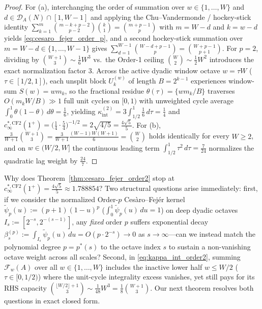 \documentclass[11pt,reqno]{amsart}
\theoremstyle{definition}
\theoremstyle{remark}
\begin{document}
\begin{proof}
For (a), interchanging the order of summation over $w \in \{1, \dots, W\}$ and $d \in \mathcal{D}_A(N) \cap [1, W - 1]$ and applying the Chu--Vandermonde / hockey-stick identity $\sum_{k=1}^m \binom{m - k + p - 2}{p - 2}\binom{k}{1} = \binom{m + p - 1}{p}$ with $m = W - d$ and $k = w - d$ yields \eqref{eq:cesaro_fejer_order_p}, and a second hockey-stick summation over $m = W - d \in \{1, \dots, W - 1\}$ gives $\sum_{d=1}^{W-1} \binom{W - d + p - 1}{p} = \binom{W + p - 1}{p + 1}$. For $p = 2$, dividing by $\binom{W+1}{3} \sim \frac{1}{6}W^3$ vs.\ the Order-1 ceiling $\binom{W}{2} \sim \frac{1}{2}W^2$ introduces the exact normalization factor $3$. Across the active dyadic window octave $w = \tau W$ ($\tau \in [1/2, 1]$), each unsplit block $U_k^{(w)}$ of length $B = 2^{k-1}$ experiences window-sum $S(w) = w m_k$, so the fractional residue $\theta(\tau) = \{w m_k / B\}$ traverses $O(m_k W / B) \gg 1$ full unit cycles on $[0, 1)$ with unweighted cycle average $\int_0^1 \theta(1-\theta)\,d\theta = \frac{1}{6}$, yielding $\kappa_{\mathrm{int}}^{(2)} = 3 \int_{1/2}^1 \frac{1}{6}\,d\tau = \frac{1}{4}$ and $c_\infty^{*,\mathrm{CF2}}(1^+) = \bigl(\frac{1}{4}\cdot\frac{5}{4}\bigr)^{-1/2} = 2\sqrt{4/5} = \frac{4\sqrt{5}}{5}$. For (b), $\frac{3}{W+1}\binom{W+1}{3} = \frac{3}{W+1}\frac{(W-1)W(W+1)}{6} = \binom{W}{2}$ holds identically for every $W \ge 2$, and on $w \in (W/2, W]$ the continuous leading term $\int_{1/2}^1 \tau^2\,d\tau = \frac{7}{24}$ normalizes the quadratic lag weight by $\frac{24}{7}$.
\end{proof}

Why does Theorem~\ref{thm:cesaro_fejer_order2} stop at $c_\infty^{*,\mathrm{CF2}}(1^+) = \frac{4\sqrt{5}}{5} \approx 1.788854$? Two structural questions arise immediately: first, if we consider the normalized Order-$p$ Ces\`aro--Fej\'er kernel $\tilde{\psi}_p(u) := (p + 1)(1 - u)^p$ ($\int_0^1 \tilde{\psi}_p(u)\,du = 1$) on deep dyadic octaves $I_s := [2^{-s}, 2^{-(s-1)}]$, any \emph{fixed} order $p$ suffers exponential decay $\beta_s^{(p)} := \int_{I_s} \tilde{\psi}_p(u)\,du = O(p \cdot 2^{-s}) \to 0$ as $s \to \infty$---can we instead match the polynomial degree $p = p^*(s)$ to the octave index $s$ to sustain a non-vanishing octave weight across all scales? Second, in \eqref{eq:kappa_int_order2}, summing $\mathcal{F}_w(A)$ over all $w \in \{1, \dots, W\}$ includes the inactive lower half $w \le W/2$ ($\tau \in [0, 1/2)$) where the unit-cycle integrality excess vanishes, yet still pays for its RHS capacity $\binom{\lfloor W/2\rfloor + 1}{3} \sim \frac{1}{48}W^3 = \frac{1}{8}\binom{W+1}{3}$. Our next theorem resolves both questions in exact closed form.
\end{document}
